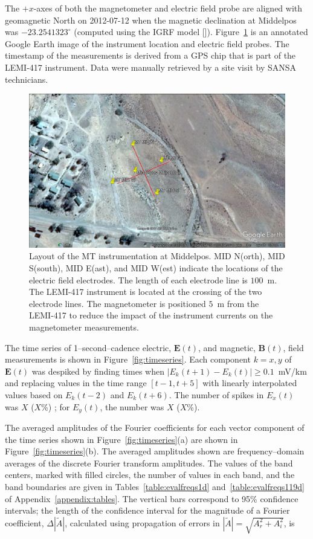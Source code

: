 \documentclass[draft,linenumbers]{agujournal2018}
\begin{document}
The $+x$-axes of both the magnetometer and electric field probe are aligned with geomagnetic North on 2012-07-12 when the magnetic declination at Middelpos was $-23.2541323^\circ$ (computed using the IGRF model [\cite{igrf}]). Figure~\ref{fig:site} is an annotated Google Earth image of the instrument location and electric field probes. The timestamp of the measurements is derived from a GPS chip that is part of the LEMI-417 instrument. Data were manually retrieved by a site visit by SANSA technicians. 

\begin{figure}[h]
  \centering
  \includegraphics[width=\textwidth]{figures/site.png}
  \caption{Layout of the MT instrumentation at Middelpos. MID N(orth), MID S(south), MID E(ast), and MID W(est) indicate the locations of the electric field electrodes. The length of each electrode line is $100$~m. The LEMI-417 instrument is located at the crossing of the two electrode lines. The magnetometer is positioned $5$~m from the LEMI-417 to reduce the impact of the instrument currents on the magnetometer measurements. 
}
 \label{fig:site}
\end{figure}

The time series of 1--second--cadence electric, $\mathbf{E}(t)$, and magnetic, $\mathbf{B}(t)$, field measurements is shown in Figure~\ref{fig:timeseries}. Each component $k=x, y$ of $\mathbf{E}(t)$ was despiked by finding times when $|E_k(t+1)-E_k(t)|\ge 0.1$~mV/km and replacing values in the time range $[t-1, t+5]$ with linearly interpolated values based on $E_k(t-2)$ and $E_k(t+6)$. The number of spikes in $E_x(t)$ was $X$  ($X$\%) ; for $E_y(t)$, the number was $X$ ($X$\%).

The averaged amplitudes of the Fourier coefficients for each vector component of the time series shown in Figure~\ref{fig:timeseries}(a) are shown in Figure~\ref{fig:timeseries}(b). The averaged amplitudes shown are frequency--domain averages of the discrete Fourier transform amplitudes. The values of the band centers, marked with filled circles, the number of values in each band, and the band boundaries are given in Tables~\ref{table:evalfreqs1d} and~\ref{table:evalfreqs119d} of Appendix~\ref{appendix:tables}. The vertical bars correspond to 95\% confidence intervals; the length of the confidence interval for the magnitude of a Fourier coefficient, $\Delta|\widetilde{A}|$, calculated using propagation of errors in $|\widetilde{A}| = \sqrt{A_r^2 + A_i^2}$, is
\end{document}
